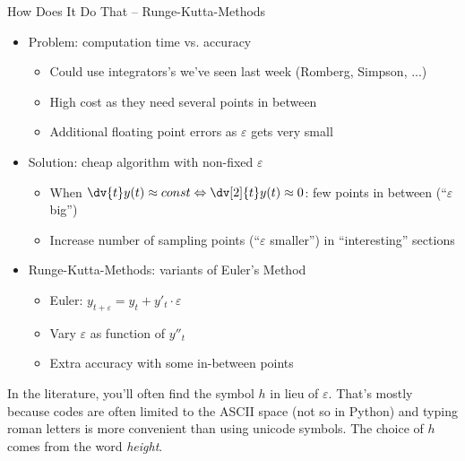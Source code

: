 \begin{frame}{How Does It Do That -- Runge-Kutta-Methods}
%
\begin{itemize}
\item Problem: computation time vs. accuracy
	\begin{itemize}
	\item Could use integrators's we've seen last week (Romberg, Simpson, ...)
	\item High cost as they need several points in between
	\item Additional floating point errors as $\varepsilon$ gets very small
	\end{itemize}
\item Solution: cheap algorithm with non-fixed $\varepsilon$
	\begin{itemize}
	\item When $\dv{t} y(t) \approx const \Leftrightarrow \dv[2]{t} y(t) \approx 0$: few points in between (\enquote{$\varepsilon$ big})
	\item Increase number of sampling points (\enquote{$\varepsilon$ smaller}) in \enquote{interesting} sections
	\end{itemize}
\item Runge-Kutta-Methods: variants of Euler's Method
	\begin{itemize}
	\item Euler: $y_{t + \varepsilon} = y_t + y'_t \cdot \varepsilon$
	\item Vary $\varepsilon$ as function of $y''_t$
	\item Extra accuracy with some in-between points
	\end{itemize}
\end{itemize}
%
\begin{hintbox}[Notation]
\scriptsize
In the literature, you'll often find the symbol $h$ in lieu of $\varepsilon$. That's mostly because codes are often limited to the ASCII space (not so in Python) and typing roman letters is more convenient than using unicode symbols. The choice of $h$ comes from the word \emph{height}.
\end{hintbox}
%
\end{frame}


